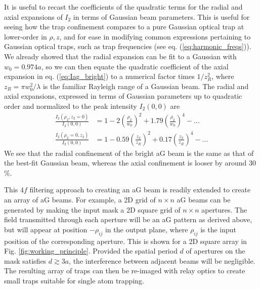 It is useful to recast the coefficients of the quadratic terms for the radial and axial expansions of $I_2$ in terms of Gaussian beam parameters. This is useful for seeing how the trap confinement compares to a pure Gaussian optical trap at lower-order in $\rho,z$, and for ease in modifying common expressions pertaining to Gaussian optical traps, such as trap frequencies (see eq. (\ref{eq:harmonic_freqs})). We already showed that the radial expansion can be fit to a Gaussian with $w_0=0.974 a$, so we can then  equate the quadratic coefficient of the axial expansion in eq. (\ref{eq:Iag_bright}) to a numerical factor times $1/z_R^2$, where $z_R=\pi w_0^2/\lambda$ is the familiar Rayleigh range of a Gaussian beam.
The radial and axial expansions, expressed in terms of Gaussian parameters up to quadratic order and normalized to the peak intensity $I_2(0,0)$ are
\begin{equation}\label{eq:Iag_bright2}
    \begin{aligned}
    \frac{I_2(\rho_2,z_2=0)}{I_2(0,0)} &= 1 - 2 \left(\frac{\rho_2}{w_0}\right)^2 + 1.79 \left(\frac{\rho_2}{w_0}\right)^4 - ... \\
    \frac{I_2(\rho_2=0,z_2)}{I_2(0,0)} &= 1 - 0.59 \left(\frac{z_2}{z_R}\right)^2 + 0.17 \left(\frac{z_2}{z_R}\right)^4 - ...
    \end{aligned}
\end{equation}
We see that the radial confinement of the bright aG beam is the same as that of the best-fit Gaussian beam, whereas the axial confinement is looser by around 30$\%$.

This $4f$ filtering approach to creating an aG beam is readily extended to create an array of aG beams. For example, a 2D grid of $n \times n$ aG beams can be generated by making the input mask a 2D square grid of $n \times n$ apertures. The field transmitted through each aperture will be an aG pattern as derived above, but will appear at position $-\rho_{ij}$ in the output plane, where $\rho_{ij}$ is the input position of the corresponding aperture. This is shown for a 2D square array in Fig. \ref{fig:working_principle}. Provided the spatial period $d$ of apertures on the mask satisfies $d \gtrsim 3a$, the interference between adjacent beams will be negligible. The resulting array of traps can then be re-imaged with relay optics to create small  traps suitable for single atom trapping. 

